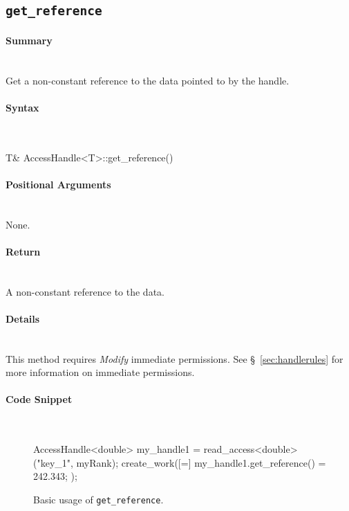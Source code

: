 \subsection{\texttt{get\_reference}}

\paragraph{Summary}\mbox{}\\
Get a non-constant reference to the data pointed to by the handle.

\paragraph{Syntax}\mbox{}\\
\begin{CppCode}
T& AccessHandle<T>::get_reference()
\end{CppCode}

\paragraph{Positional Arguments}\mbox{}\\
None.

\paragraph{Return}\mbox{}\\
A non-constant reference to the data.  

\paragraph{Details}\mbox{}\\
This method requires {\it Modify} immediate permissions.  See
\S~\ref{sec:handlerules} for more information on immediate permissions.

\paragraph{Code Snippet}\mbox{}\\
\begin{figure}[!h]
\begin{CppCodeNumb}
AccessHandle<double> my_handle1 = read_access<double>("key_1", myRank);
create_work([=]{
  my_handle1.get_reference() = 242.343;
});
\end{CppCodeNumb}
\label{fig:fe_api_getreference}
\caption{Basic usage of \lstinline|get_reference|.}
\end{figure}


